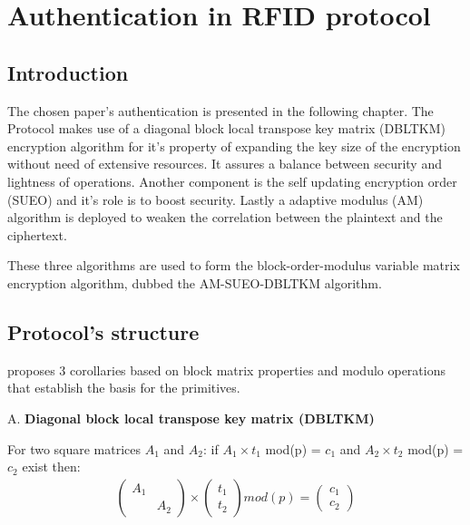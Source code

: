 \chapter{Authentication in RFID protocol}

\section{Introduction}
    The chosen paper\cite{BOM}'s authentication is presented in the following chapter. The Protocol makes use of a diagonal block local transpose key matrix (DBLTKM) 
    encryption algorithm for it's property of 
    expanding the key size of the encryption without need of extensive resources. It assures a balance between security and lightness of operations. 
    Another component is the self updating encryption 
    order (SUEO) and it's role is to boost security. Lastly a adaptive modulus (AM) algorithm is deployed to weaken the correlation between the 
    plaintext and the ciphertext.
    
    These three algorithms are used to form the block-order-modulus variable matrix encryption algorithm, dubbed the AM-SUEO-DBLTKM algorithm.

\section{Protocol's structure}

    \cite{BOM} proposes 3 corollaries based on block matrix properties and modulo operations that establish the basis for the primitives.

    A. \textbf{Diagonal block local transpose key matrix (DBLTKM)}

    For two square matrices $A_1$ and $A_2$: if $A_1 \times t_1$ mod(p) = $c_1$ and $A_2 \times t_2$ mod(p) = $c_2$ exist then:
    \begin{gather*}
        \begin{pmatrix}
        A_1 &  \\
            & A_2
        \end{pmatrix}
        \times
        \begin{pmatrix}
            t_1  \\
            t_2
        \end{pmatrix}
        mod(p)
        =
        \begin{pmatrix}
            c_1  \\
            c_2
        \end{pmatrix}
    \end{gather*}


